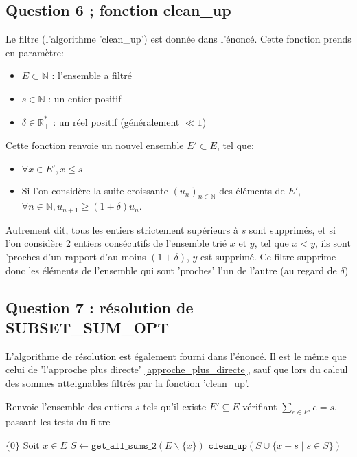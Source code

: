 \documentclass[10pt]{article}
\let\oldReturn\Return
\renewcommand{\Return}{\State\oldReturn}
\begin{document}
			\subsection{Question 6 ; fonction clean\_up}
				Le filtre (l'algorithme 'clean\_up') est donnée dans l'énoncé. Cette fonction prends en paramètre:
				\begin{itemize}[label=-]
					\setlength\itemsep{0.1em}
					\item $E \subset \mathbb{N}$ : l'ensemble a filtré
					\item $s \in \mathbb{N}$ : un entier positif
					\item $\delta \in \mathbb{R}_+^*$ : un réel positif (généralement $\ll 1$)
				\end{itemize}
				Cette fonction renvoie un nouvel ensemble $E' \subset E$, tel que:
				\begin{itemize}[label=-]
					\setlength\itemsep{0.1em}
					\item	$\forall x \in E' , x \leq s$
					\item	Si l'on considère la suite croissante $(u_n)_{n \in \mathbb{N}}$ des éléments de $E'$,
							$\forall n \in \mathbb{N}, u_{n + 1} \geq (1 + \delta)u_n $.
				\end{itemize}
	
				Autrement dit, tous les entiers strictement supérieurs à $s$ sont supprimés, et 
				si l'on considère 2 entiers consécutifs de l'ensemble trié $x$ et $y$, tel que $x < y$,
				ils sont 'proches d'un rapport d'au moins $(1 + \delta)$, $y$ est supprimé.
				Ce filtre supprime donc les éléments de l'ensemble qui sont 'proches' l'un de l'autre (au regard de $\delta$)

			\subsection{Question 7 : résolution de SUBSET\_SUM\_OPT}
				L'algorithme de résolution est également fourni dans l'énoncé.
				Il est le même que celui de 'l'approche plus directe' \ref{approche_plus_directe}, sauf que
				lors du calcul des sommes atteignables filtrés par la fonction 'clean\_up'.
				
				\begin{algorithm}
					\caption{Renvoie l'ensemble des entiers $s$ tels qu'il existe
							$E' \subseteq E$ vérifiant $\sum\limits_{e \in E'}e = s$, passant les tests du filtre}
					\begin{algorithmic}[1]
								\Return $\{0\}$
							\EndIf
							\State Soit $x \in E$
							\State $S \leftarrow \mathtt{get\_all\_sums\_2}(E \backslash \{x\})$
							\Return $\mathtt{clean\_up}(S \cup \{x + s \mid s \in S\})$
						\EndFunction
					\end{algorithmic}
				\end{algorithm}
			
\end{document}
